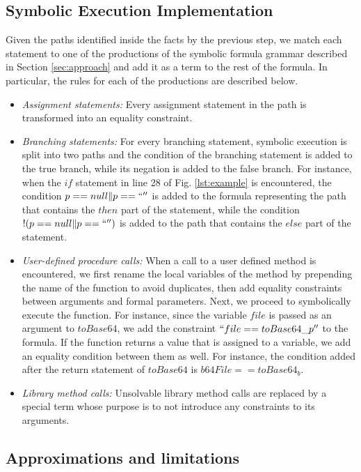 \subsection{Symbolic Execution Implementation}
Given the paths identified inside the facts by the previous step, we match each statement to one of the productions of the symbolic formula grammar described in Section \ref{sec:approach} and add it as a term to the rest of the formula. In particular, the rules for each of the productions are described below.
\begin{itemize}
\item \textit{Assignment statements:} Every assignment statement in the path is transformed into an equality constraint.
\item \textit{Branching statements:} For every branching statement, symbolic execution is split into two paths and the condition of the branching statement is added to the true branch, while its negation is added to the false branch.
For instance, when the $if$ statement in line 28 of Fig. \ref{lst:example} is encountered, the condition $p==null \| p==``''$ is added to the formula representing the path that contains the $then$ part of the statement, while the condition $!(p==null \| p==``'')$ is added to the path that contains the $else$ part of the statement.
\item \textit{User-defined procedure calls:} When a call to a user defined method is encountered, we first rename the local variables of the method by prepending the name of the function to avoid duplicates, then add equality constraints between arguments and formal parameters. Next, we proceed to symbolically execute the function. For instance, since the variable $file$ is passed as an argument to $toBase64$, we add the constraint $``file == toBase64\_p''$ to the formula. If the function returns a value that is assigned to a variable, we add an equality condition between them as well. For instance, the condition added after the return statement of $toBase64$ is $b64File==toBase64_b$.
\item \textit{Library method calls:} Unsolvable library method calls are replaced by a special term whose purpose is to not introduce any constraints to its arguments. 
\end{itemize}



\subsection{Approximations and limitations}

